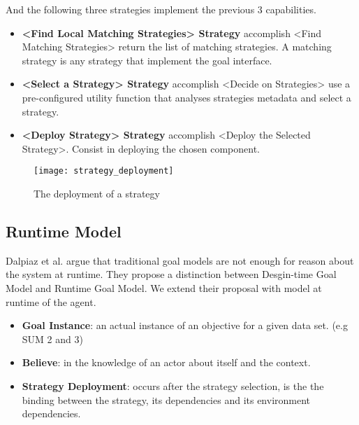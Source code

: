 And the following three strategies implement the previous 3 capabilities.

\begin{itemize}
  \item \textbf{<Find Local Matching Strategies> Strategy} accomplish <Find Matching Strategies>
  return the list of matching strategies. A matching strategy is any strategy that implement the goal interface.

  \item \textbf{<Select a Strategy> Strategy} accomplish <Decide on Strategies>
  use a pre-configured utility function that analyses strategies metadata and select a strategy.

  \item \textbf{<Deploy Strategy> Strategy} accomplish <Deploy the Selected Strategy>.
  Consist in deploying the chosen component.
\end{itemize}

\begin{figure}
  \centering
  \texttt{[image: strategy\_deployment]}
  \caption{The deployment of a strategy}
  \label{fig:agent_composition}
\end{figure}

\subsection{Runtime Model}

Dalpiaz et al. \cite{dalpiaz_runtime_2013} argue that traditional goal models are not enough for reason about the system at runtime. They propose a distinction between Desgin-time Goal Model and Runtime Goal Model. We extend their proposal with model at runtime of the agent.

\begin{itemize}

\item \textbf{Goal Instance}: an actual instance of an objective for a given data set. (e.g SUM 2 and 3)

\item \textbf{Believe}: in the knowledge of an actor about itself and the context.

\item \textbf{Strategy Deployment}: occurs after the strategy selection, is the the binding between the strategy, its dependencies and its environment dependencies.

\end{itemize}

